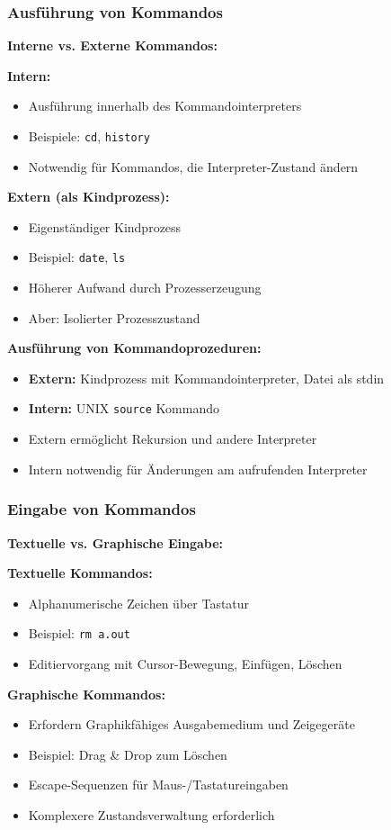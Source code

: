 \documentclass[9pt,a4paper]{extarticle}
\begin{document}
\begin{multicols*}{2}
\subsubsection{Ausführung von Kommandos}
\textbf{Interne vs. Externe Kommandos:}

\textbf{Intern:} 
\begin{itemize}
\item Ausführung innerhalb des Kommandointerpreters
\item Beispiele: \texttt{cd}, \texttt{history}
\item Notwendig für Kommandos, die Interpreter-Zustand ändern
\end{itemize}

\textbf{Extern (als Kindprozess):}
\begin{itemize}
\item Eigenständiger Kindprozess
\item Beispiel: \texttt{date}, \texttt{ls}
\item Höherer Aufwand durch Prozesserzeugung
\item Aber: Isolierter Prozesszustand
\end{itemize}

\textbf{Ausführung von Kommandoprozeduren:}
\begin{itemize}
\item \textbf{Extern:} Kindprozess mit Kommandointerpreter, Datei als stdin
\item \textbf{Intern:} UNIX \texttt{source} Kommando
\item Extern ermöglicht Rekursion und andere Interpreter
\item Intern notwendig für Änderungen am aufrufenden Interpreter
\end{itemize}

\subsubsection{Eingabe von Kommandos}
\textbf{Textuelle vs. Graphische Eingabe:}

\textbf{Textuelle Kommandos:}
\begin{itemize}
\item Alphanumerische Zeichen über Tastatur
\item Beispiel: \texttt{rm a.out}
\item Editiervorgang mit Cursor-Bewegung, Einfügen, Löschen
\end{itemize}

\textbf{Graphische Kommandos:}
\begin{itemize}
\item Erfordern Graphikfähiges Ausgabemedium und Zeigegeräte
\item Beispiel: Drag \& Drop zum Löschen
\item Escape-Sequenzen für Maus-/Tastatureingaben
\item Komplexere Zustandsverwaltung erforderlich
\end{itemize}


\end{multicols*}
\end{document}

